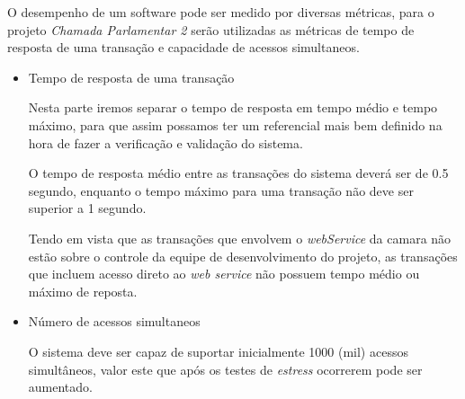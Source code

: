 
O desempenho de um software pode ser medido por diversas métricas, para o projeto \textit{Chamada Parlamentar 2} serão utilizadas as métricas de tempo de resposta de uma transação e capacidade de acessos simultaneos.

\begin{itemize}

	\item{Tempo de resposta de uma transação}

		Nesta parte iremos separar o tempo de resposta em tempo médio e tempo máximo, para que assim possamos ter um referencial mais bem definido na hora de fazer a verificação e validação do sistema.

		O tempo de resposta médio entre as transações do sistema deverá ser de 0.5 segundo, enquanto o tempo máximo para uma transação não deve ser superior a 1 segundo.

		Tendo em vista que as transações que envolvem o \textit{webService} da camara não estão sobre o controle da equipe de desenvolvimento do projeto, as transações que incluem acesso direto ao \textit{web service} não possuem tempo médio ou máximo de reposta.

	\item{Número de acessos simultaneos}

		O sistema deve ser capaz de suportar inicialmente 1000 (mil) acessos simultâneos, valor este que após os testes de \textit{estress} ocorrerem pode ser aumentado.

\end{itemize}